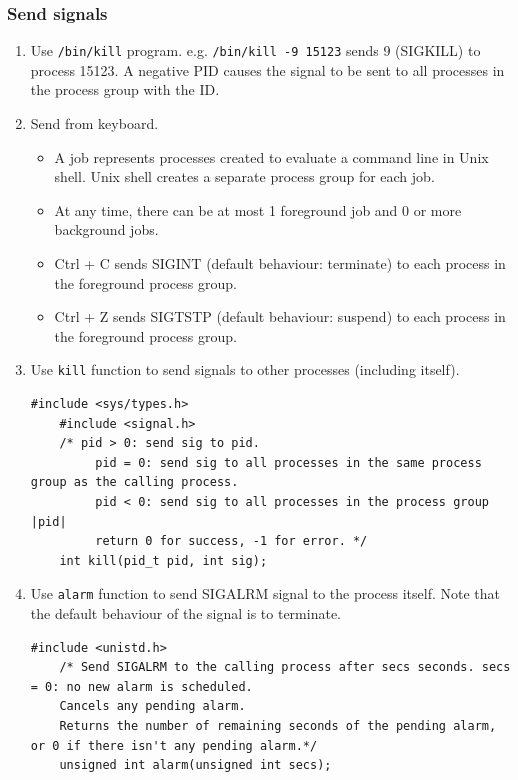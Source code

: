 \subsubsection{Send signals}
\begin{enumerate}
	\item Use \texttt{/bin/kill} program. e.g. \texttt{/bin/kill -9 15123} sends 9 (SIGKILL) to process 15123. A negative PID causes the signal to be sent to all processes in the process group with the ID.
	\item Send from keyboard. 
	\begin{itemize}
		\item A job represents processes created to evaluate a command line in Unix shell. Unix shell creates a separate process group for each job.
		\item At any time, there can be at most 1 foreground job and 0 or more background jobs.
		\item Ctrl + C sends SIGINT (default behaviour: terminate) to each process in the foreground process group. 
		\item Ctrl + Z sends SIGTSTP (default behaviour: suspend) to each process in the foreground process group.
	\end{itemize}
	\item Use \texttt{kill} function to send signals to other processes (including itself).
	\begin{lstlisting}[frame=single]
	#include <sys/types.h>
	#include <signal.h>
	/* pid > 0: send sig to pid.
		 pid = 0: send sig to all processes in the same process group as the calling process.
		 pid < 0: send sig to all processes in the process group |pid| 
		 return 0 for success, -1 for error. */
	int kill(pid_t pid, int sig);
	\end{lstlisting}
	\item Use \texttt{alarm} function to send SIGALRM signal to the process itself. Note that the default behaviour of the signal is to terminate.
	\begin{lstlisting}[frame=single]
	#include <unistd.h>
	/* Send SIGALRM to the calling process after secs seconds. secs = 0: no new alarm is scheduled.
	Cancels any pending alarm. 
	Returns the number of remaining seconds of the pending alarm, or 0 if there isn't any pending alarm.*/
	unsigned int alarm(unsigned int secs);
	\end{lstlisting}
	\end{enumerate}
